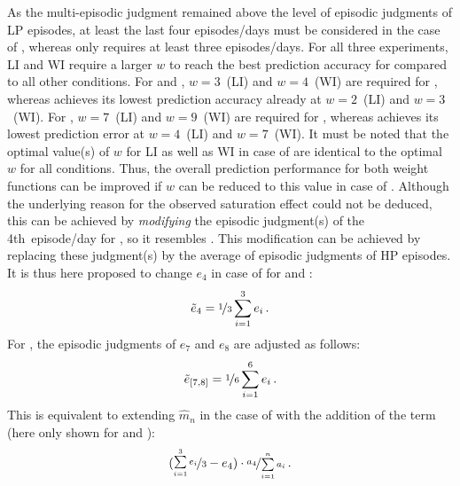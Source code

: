 As the multi-episodic judgment remained above the level of episodic judgments of \ac{LP} episodes, at least the last four episodes/days must be considered in the case of , whereas  only requires at least three episodes/days.
For all three experiments, LI and WI require a larger $\mathit{w}$ to reach the best prediction accuracy for  compared to all other conditions.
For  and \EIIa{}, $\mathit{w}=3$~(LI) and $\mathit{w}=4$~(WI) are required for , whereas  achieves its lowest prediction accuracy already at $\mathit{w}=2$~(LI) and $\mathit{w}=3$~(WI).
For , $\mathit{w}=7$~(LI) and $\mathit{w}=9$~(WI) are required for , whereas  achieves its lowest prediction error at $\mathit{w}=4$~(LI) and $\mathit{w}=7$~(WI).
It must be noted that the optimal value(s) of $\mathit{w}$ for LI as well as WI in case of  are identical to the optimal $\mathit{w}$ for all conditions.
Thus, the overall prediction performance for both weight functions can be improved if $\mathit{w}$ can be reduced to this value in case of .
Although the underlying reason for the observed saturation effect could not be deduced, this can be achieved by \emph{modifying} the episodic judgment(s) of the 4th~episode/day for , so it resembles .
This modification can be achieved by replacing these judgment(s) by the average of episodic judgments of \ac{HP} episodes. 
It is thus here proposed to change $\mathit{e_4}$ in case of  for  and \EIIa{}:
\begin{equation}\label{eq:saturate:modify1}
\tilde{e}_4=\nicefrac{1}{3} \sum\limits_{i=1}^{3}e_i \, .
\end{equation}
For , the episodic judgments of $\mathit{e_7}$ and $\mathit{e_8}$ are adjusted as follows:
\begin{equation}\label{eq:saturate:modify2}
\tilde{e}_{[7,8]}= \nicefrac{1}{6} \sum\limits_{i=1}^{6}e_i \, .
\end{equation}
This is equivalent to extending $\mathit{\hat{m}_n}$ in the case of  with the addition of the term (here only shown for  and \EIIa{}):
\begin{equation}\label{eq:saturate:addition}
(\nicefrac{\sum\limits_{i=1}^{3}e_i}{3} - e_4) \cdot  \nicefrac{a_4}{\sum\limits_{i=1}^{n}a_i}\, .
\end{equation}

